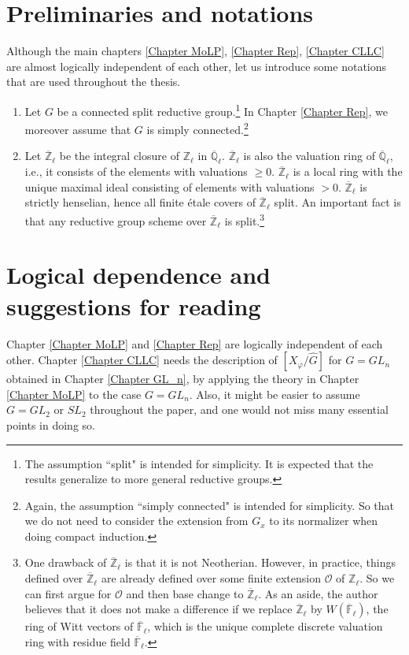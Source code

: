 \section{Preliminaries and notations}
Although the main chapters \ref{Chapter MoLP}, \ref{Chapter Rep}, \ref{Chapter CLLC} are almost logically independent of each other, let us introduce some notations that are used throughout the thesis.
\begin{enumerate}
	\item Let $G$ be a connected split reductive group.\footnote{The assumption ``split" is intended for simplicity. It is expected that the results generalize to more general reductive groups.} In Chapter \ref{Chapter Rep}, we moreover assume that $G$ is simply connected.\footnote{Again, the assumption ``simply connected" is intended for simplicity. So that we do not need to consider the extension from $G_x$ to its normalizer when doing compact induction.}
	\item Let $\overline{\mathbb{Z}}_{\ell}$ be the integral closure of $\mathbb{Z}_{\ell}$ in $\overline{\mathbb{Q}}_{\ell}$. $\overline{\mathbb{Z}}_{\ell}$ is also the valuation ring of  $\overline{\mathbb{Q}}_{\ell}$, i.e., it consists of the elements with valuations $\geq 0$. $\overline{\mathbb{Z}}_{\ell}$ is a local ring with the unique maximal ideal consisting of elements with valuations $> 0$. $\overline{\mathbb{Z}}_{\ell}$ is strictly henselian, hence all finite étale covers of $\overline{\mathbb{Z}}_{\ell}$ split. An important fact is that any reductive group scheme over $\overline{\mathbb{Z}}_{\ell}$ is split.\footnote{One drawback of $\overline{\mathbb{Z}}_{\ell}$ is that it is not Neotherian. However, in practice, things defined over $\overline{\mathbb{Z}}_{\ell}$ are already defined over some finite extension $\mathcal{O}$ of $\mathbb{Z}_{\ell}$. So we can first argue for $\mathcal{O}$ and then base change to $\overline{\mathbb{Z}}_{\ell}$. As an aside, the author believes that it does not make a difference if we replace $\overline{\mathbb{Z}}_{\ell}$ by $W(\overline{\mathbb{F}}_{\ell})$, the ring of Witt vectors of $\overline{\mathbb{F}}_{\ell}$, which is the unique complete discrete valuation ring with residue field $\overline{\mathbb{F}}_{\ell}$.}
\end{enumerate}


\section{Logical dependence and suggestions for reading}
Chapter \ref{Chapter MoLP} and \ref{Chapter Rep} are logically independent of each other. Chapter \ref{Chapter CLLC} needs the description of $[X_{\varphi}/\hat{G}]$ for $G=GL_n$ obtained in Chapter \ref{Chapter GL_n}, by applying the theory in Chapter \ref{Chapter MoLP} to the case $G=GL_n$. Also, it might be easier to assume $G=GL_2$ or $SL_2$ throughout the paper, and one would not miss many essential points in doing so.

